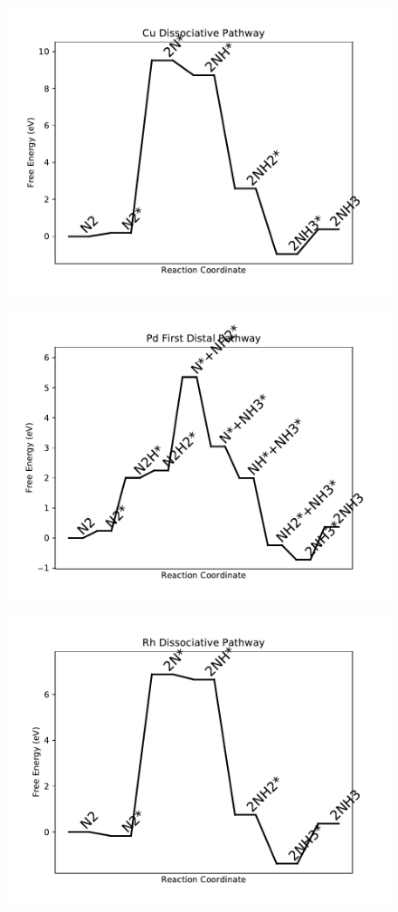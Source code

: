 \begin{figure}
\centering
\includegraphics[width=0.8\linewidth]{data/plots/Cu_dissociative.pdf}
\end{figure}

\begin{figure}
\centering
\includegraphics[width=0.8\linewidth]{data/plots/Pd_distal_1.pdf}
\end{figure}

\begin{figure}
\centering
\includegraphics[width=0.8\linewidth]{data/plots/Rh_dissociative.pdf}
\end{figure}

